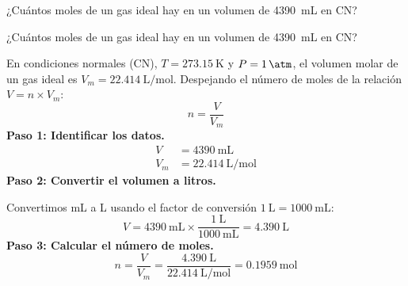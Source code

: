 \begin{exercise}
    ¿Cuántos moles de un gas ideal hay en un volumen de \qty{4390}{\mL} en CN?
    \begin{solu}
        ¿Cuántos moles de un gas ideal hay en un volumen de \qty{4390}{\mL} en CN?


        En condiciones normales (CN), $T = \qty{273.15}{\kelvin}$ y $P = \qty{1}{\atm}$,
        el volumen molar de un gas ideal es $V_m = \qty{22.414}{\liter\per\mol}$. Despejando
        el número de moles de la relación $V = n \times V_m$:
        \begin{equation*}
            n = \frac{V}{V_m}
        \end{equation*}
        \textbf{Paso 1: Identificar los datos.}
        \begin{align*}
            V   &= \qty{4390}{\mL} \\
            V_m &= \qty{22.414}{\liter\per\mol}
        \end{align*}
        \textbf{Paso 2: Convertir el volumen a litros.}

        Convertimos mL a L usando el factor de conversión $\qty{1}{\liter} = \qty{1000}{\mL}$:
        \begin{equation*}
            V = \qty{4390}{\mL} \times \frac{\qty{1}{\liter}}{\qty{1000}{\mL}}
            = \qty{4.390}{\liter}
        \end{equation*}
        \textbf{Paso 3: Calcular el número de moles.}
        \begin{equation*}
            n = \frac{V}{V_m} = \frac{\qty{4.390}{\liter}}{\qty{22.414}{\liter\per\mol}}
            = \boxed{\qty{0.1959}{\mol}}
        \end{equation*}
    \end{solu}
\end{exercise}
